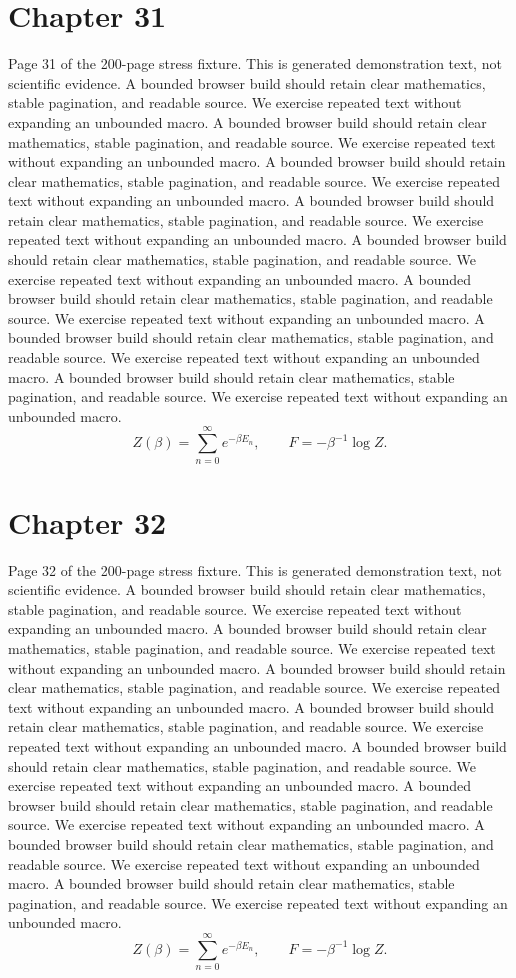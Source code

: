 \documentclass[11pt]{article}
\begin{document}
\section*{Chapter 31}
Page 31 of the 200-page stress fixture. This is generated demonstration text, not scientific evidence.
A bounded browser build should retain clear mathematics, stable pagination, and readable source. We exercise repeated text without expanding an unbounded macro.
A bounded browser build should retain clear mathematics, stable pagination, and readable source. We exercise repeated text without expanding an unbounded macro.
A bounded browser build should retain clear mathematics, stable pagination, and readable source. We exercise repeated text without expanding an unbounded macro.
A bounded browser build should retain clear mathematics, stable pagination, and readable source. We exercise repeated text without expanding an unbounded macro.
A bounded browser build should retain clear mathematics, stable pagination, and readable source. We exercise repeated text without expanding an unbounded macro.
A bounded browser build should retain clear mathematics, stable pagination, and readable source. We exercise repeated text without expanding an unbounded macro.
A bounded browser build should retain clear mathematics, stable pagination, and readable source. We exercise repeated text without expanding an unbounded macro.
A bounded browser build should retain clear mathematics, stable pagination, and readable source. We exercise repeated text without expanding an unbounded macro.
\[Z(\beta)=\sum_{n=0}^{\infty}e^{-\beta E_n},\qquad F=-\beta^{-1}\log Z.\]
\newpage
\section*{Chapter 32}
Page 32 of the 200-page stress fixture. This is generated demonstration text, not scientific evidence.
A bounded browser build should retain clear mathematics, stable pagination, and readable source. We exercise repeated text without expanding an unbounded macro.
A bounded browser build should retain clear mathematics, stable pagination, and readable source. We exercise repeated text without expanding an unbounded macro.
A bounded browser build should retain clear mathematics, stable pagination, and readable source. We exercise repeated text without expanding an unbounded macro.
A bounded browser build should retain clear mathematics, stable pagination, and readable source. We exercise repeated text without expanding an unbounded macro.
A bounded browser build should retain clear mathematics, stable pagination, and readable source. We exercise repeated text without expanding an unbounded macro.
A bounded browser build should retain clear mathematics, stable pagination, and readable source. We exercise repeated text without expanding an unbounded macro.
A bounded browser build should retain clear mathematics, stable pagination, and readable source. We exercise repeated text without expanding an unbounded macro.
A bounded browser build should retain clear mathematics, stable pagination, and readable source. We exercise repeated text without expanding an unbounded macro.
\[Z(\beta)=\sum_{n=0}^{\infty}e^{-\beta E_n},\qquad F=-\beta^{-1}\log Z.\]
\newpage
\end{document}
